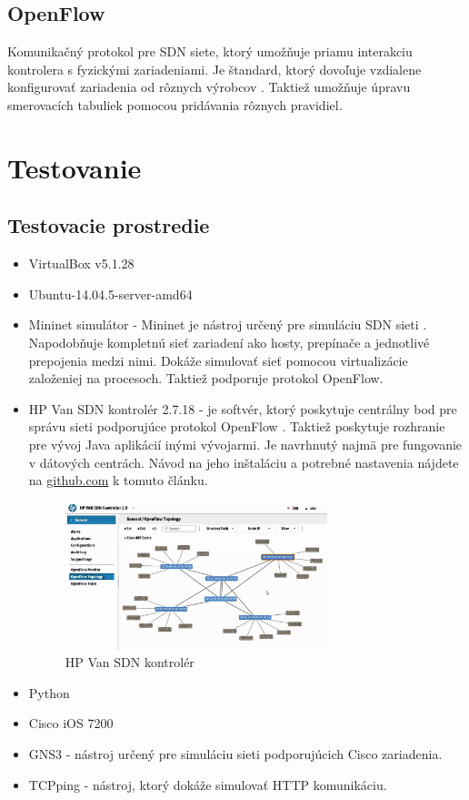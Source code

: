 \documentclass[conference]{IEEEtran}
\begin{document}
\subsection{OpenFlow}

Komunikačný protokol pre SDN siete, ktorý umožňuje priamu interakciu kontrolera s fyzickými zariadeniami. Je štandard, ktorý dovoľuje vzdialene konfigurovať zariadenia od rôznych výrobcov \cite{fourth}. Taktiež umožňuje úpravu smerovacích tabuliek pomocou pridávania rôznych pravidiel.

\section{Testovanie}

\subsection{Testovacie prostredie}

\begin{itemize}
\item{VirtualBox v5.1.28}
\item{Ubuntu-14.04.5-server-amd64}
\item{Mininet simulátor -}
Mininet je nástroj určený pre simuláciu SDN sieti \cite{fifth}. Napodobňuje kompletnú sieť zariadení ako hosty, prepínače a jednotlivé prepojenia medzi nimi. Dokáže simulovať sieť pomocou virtualizácie založeniej na procesoch. Taktiež podporuje protokol OpenFlow.
\item{HP Van SDN kontrolér 2.7.18 -} je softvér, ktorý poskytuje centrálny bod pre správu sieti podporujúce protokol OpenFlow \cite{sixth}. Taktiež poskytuje rozhranie pre vývoj Java aplikácií inými vývojarmi. Je navrhnutý najmä pre fungovanie v dátových centrách. Návod na jeho inštaláciu a potrebné nastavenia nájdete na \url{github.com} k tomuto článku.

\begin{figure}[h!]
\centering
\includegraphics[width=3in]{../img/HPVAN}
\caption{HP Van SDN kontrolér}
\end{figure}


\item{Python}
\item{Cisco iOS 7200}
\item{GNS3 -} nástroj určený pre simuláciu sieti podporujúcich Cisco zariadenia.
\item{TCPping -} nástroj, ktorý dokáže simulovať HTTP komunikáciu.
\end{itemize}
\end{document}
